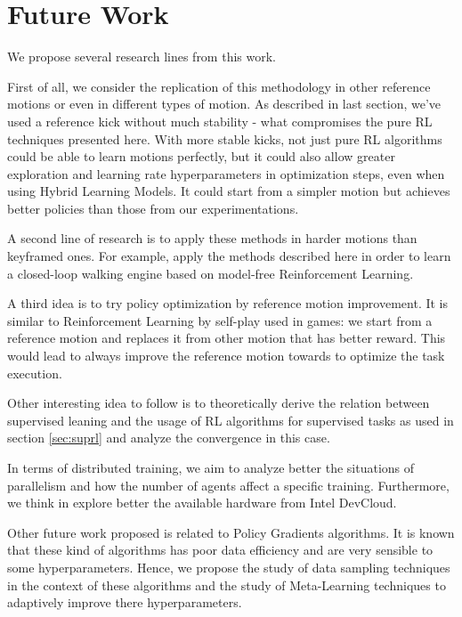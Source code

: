 \section{Future Work}

We propose several research lines from this work.

First of all, we consider the replication of this methodology in other reference motions or even in different types of motion. As described in last section, we've used a reference kick without much stability - what compromises the pure RL techniques presented here. With more stable kicks, not just pure RL algorithms could be able to learn motions perfectly, but it could also allow greater exploration and learning rate hyperparameters in optimization steps, even when using Hybrid Learning Models. It could start from a simpler motion but achieves better policies than those from our experimentations.

A second line of research is to apply these methods in harder motions than keyframed ones. For example, apply the methods described here in order to learn a closed-loop walking engine based on model-free Reinforcement Learning.

A third idea is to try policy optimization by reference motion improvement. It is similar to Reinforcement Learning by self-play used in games: we start from a reference motion and replaces it from other motion that has better reward. This would lead to always improve the reference motion towards to optimize the task execution.

Other interesting idea to follow is to theoretically derive the relation between supervised leaning and the usage of RL algorithms for supervised tasks as used in section \ref{sec:suprl} and analyze the convergence in this case.

In terms of distributed training, we aim to analyze better the situations of parallelism and how the number of agents affect a specific training. Furthermore, we think in explore better the available hardware from Intel DevCloud.


Other future work proposed is related to Policy Gradients algorithms. It is known that these kind of algorithms has poor data efficiency and are very sensible to some hyperparameters. Hence, we propose the study of data sampling techniques in the context of these algorithms and the study of Meta-Learning techniques \cite{metalearning} to adaptively improve there hyperparameters.


